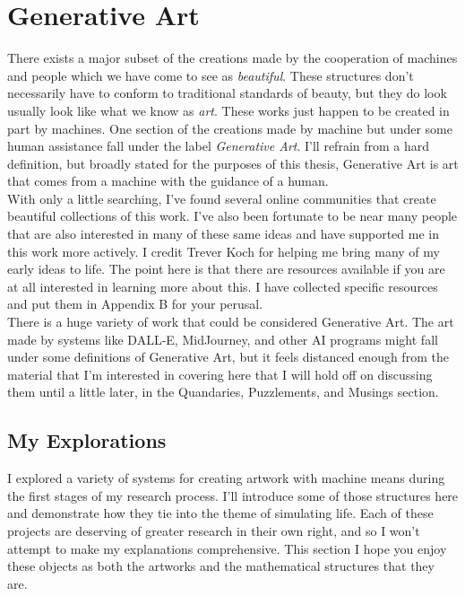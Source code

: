 \documentclass[12pt,twoside]{reedthesis}
\begin{document}
\section{Generative Art}

	There exists a major subset of the creations made by the cooperation of machines and people which we have come to see as \textit{beautiful}. These structures don't necessarily have to conform to traditional standards of beauty, but they do look usually look like what we know as \textit{art}. These works just happen to be created in part by machines. One section of the creations made by machine but under some human assistance fall under the label \textit{Generative Art}. I'll refrain from a hard definition, but broadly stated for the purposes of this thesis, Generative Art is art that comes from a machine with the guidance of a human.\\
	
	With only a little searching, I've found several online communities that create beautiful collections of this work. I've also been fortunate to be near many people that are also interested in many of these same ideas and have supported me in this work more actively. I credit Trever Koch for helping me bring many of my early ideas to life. The point here is that there are resources available if you are at all interested in learning more about this. I have collected specific resources and put them in Appendix B for your perusal.\\
	
	There is a huge variety of work that could be considered Generative Art. The art made by systems like DALL-E, MidJourney, and other AI programs might fall under some definitions of Generative Art, but it feels distanced enough from the material that I'm interested in covering here that I will hold off on discussing them until a little later, in the Quandaries, Puzzlements, and Musings section.\\
	
\subsection{My Explorations} %
	
	I explored a variety of systems for creating artwork with machine means during the first stages of my research process. I'll introduce some of those structures here and demonstrate how they tie into the theme of simulating life. Each of these projects are deserving of greater research in their own right, and so I won't attempt to make my explanations comprehensive. This section I hope you enjoy these objects as both the artworks and the mathematical structures that they are.\\
\end{document}
